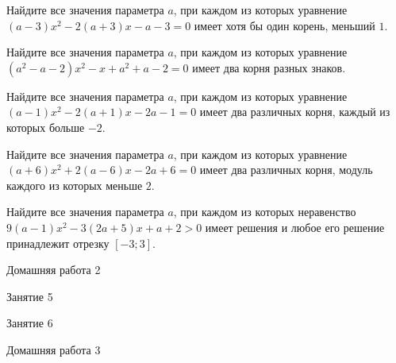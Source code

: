 \begin{class}[number=4]
	\begin{listofex}
		\item Найдите все значения параметра \(a\), при каждом из которых уравнение \( (a-3)x^2 - 2(a+3)x - a - 3 = 0 \) имеет хотя бы один корень, меньший \(1\).
		\item Найдите все значения параметра \(a\), при каждом из которых уравнение \( (a^2-a-2)x^2 - x + a^2 + a -2 = 0 \) имеет два корня разных знаков.
		\item Найдите все значения параметра \(a\), при каждом из которых уравнение \( (a-1)x^2 - 2(a+1)x-2a-1=0 \) имеет два различных корня, каждый из которых больше \(-2\).
		\item Найдите все значения параметра \(a\), при каждом из которых уравнение \( (a+6)x^2 +2(a-6)x-2a+6=0 \) имеет два различных корня, модуль каждого из которых меньше \(2\).
		\item Найдите все значения параметра \(a\), при каждом из которых неравенство \( 9(a-1)x^2-3(2a+5)x+a+2>0 \) имеет решения и любое его решение принадлежит отрезку \([-3;3]\).
	\end{listofex}
\end{class}

\begin{homework}[number=2]
	\begin{listofex}
		\item Домашняя работа 2
	\end{listofex}
\end{homework}

\begin{class}[number=5]
	\begin{listofex}
		\item Занятие 5
	\end{listofex}
\end{class}

\begin{class}[number=6]
	\begin{listofex}
		\item Занятие 6
	\end{listofex}
\end{class}

\begin{homework}[number=3]
	\begin{listofex}
		\item Домашняя работа 3
	\end{listofex}
\end{homework}


